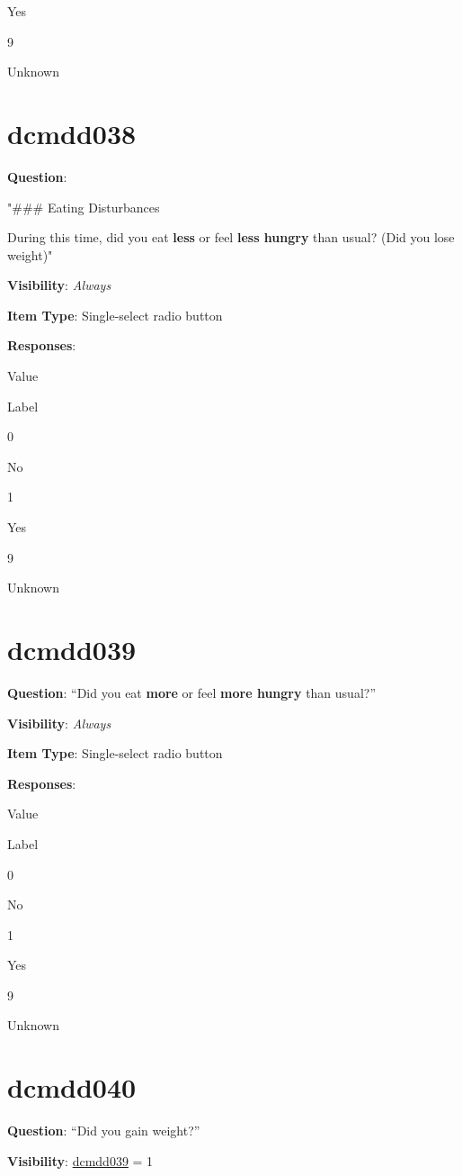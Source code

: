 \documentclass[
]{book}
\begin{document}
Yes

9

Unknown

\hypertarget{dcmdd038}{%
\section{dcmdd038}\label{dcmdd038}}

\textbf{Question}:

"\#\#\# Eating Disturbances

During this time, did you eat \textbf{less} or feel \textbf{less hungry} than usual? (Did you lose weight)"

\textbf{Visibility}: \emph{Always}

\textbf{Item Type}: Single-select radio button

\textbf{Responses}:

Value

Label

0

No

1

Yes

9

Unknown

\hypertarget{dcmdd039}{%
\section{dcmdd039}\label{dcmdd039}}

\textbf{Question}: ``Did you eat \textbf{more} or feel \textbf{more hungry} than usual?''

\textbf{Visibility}: \emph{Always}

\textbf{Item Type}: Single-select radio button

\textbf{Responses}:

Value

Label

0

No

1

Yes

9

Unknown

\hypertarget{dcmdd040}{%
\section{dcmdd040}\label{dcmdd040}}

\textbf{Question}: ``Did you gain weight?''

\textbf{Visibility}: \protect\hyperlink{dcmdd039}{dcmdd039} = 1
\end{document}
